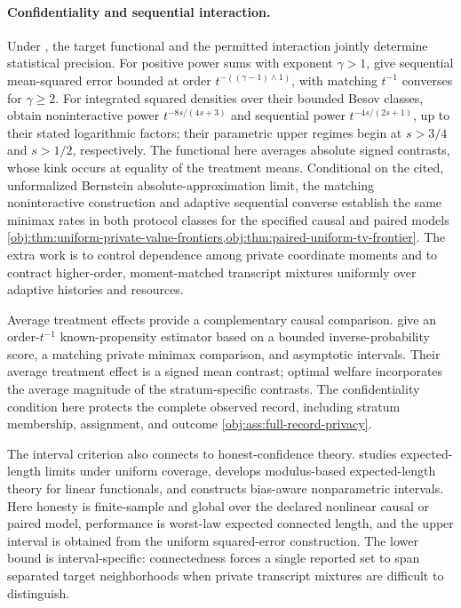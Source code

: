 \documentclass[11pt]{article}
\begin{document}
\paragraph{Confidentiality and sequential interaction.}
Under , the target functional and the permitted interaction jointly determine statistical precision. For positive power sums with exponent \(\gamma>1\), \citet[Theorems~2.4--2.7]{ButuceaIssartel2021Functionals} give sequential mean-squared error bounded at order \(t^{-((\gamma-1)\wedge1)}\), with matching \(t^{-1}\) converses for \(\gamma\ge2\). For integrated squared densities over their bounded Besov classes, \citet[Theorems~3.2--3.3 and~4.1--4.2]{ButuceaRohdeSteinberger2023Quadratic} obtain noninteractive power \(t^{-8s/(4s+3)}\) and sequential power \(t^{-4s/(2s+1)}\), up to their stated logarithmic factors; their parametric upper regimes begin at \(s>3/4\) and \(s>1/2\), respectively. The functional here averages absolute signed contrasts, whose kink occurs at equality of the treatment means. Conditional on the cited, unformalized Bernstein absolute-approximation limit, the matching noninteractive construction and adaptive sequential converse establish the same minimax rates in both protocol classes for the specified causal and paired models \cref{obj:thm:uniform-private-value-frontiers,obj:thm:paired-uniform-tv-frontier}. The extra work is to control dependence among private coordinate moments and to contract higher-order, moment-matched transcript mixtures uniformly over adaptive histories and resources.

Average treatment effects provide a complementary causal comparison. \citet[Lemma~4 and Theorem~7]{OhnishiAwan2025Randomized} give an order-\(t^{-1}\) known-propensity estimator based on a bounded inverse-probability score, a matching private minimax comparison, and asymptotic intervals. Their average treatment effect is a signed mean contrast; optimal welfare incorporates the average magnitude of the stratum-specific contrasts. The confidentiality condition here protects the complete observed record, including stratum membership, assignment, and outcome \cref{obj:ass:full-record-privacy}.

The interval criterion also connects to honest-confidence theory. \citet{Low1997} studies expected-length limits under uniform coverage, \citet{CaiLow2004AdaptationCI} develops modulus-based expected-length theory for linear functionals, and \citet{ArmstrongKolesar2020HonestCI} constructs bias-aware nonparametric intervals. Here honesty is finite-sample and global over the declared nonlinear causal or paired model, performance is worst-law expected connected length, and the upper interval is obtained from the uniform squared-error construction. The lower bound is interval-specific: connectedness forces a single reported set to span separated target neighborhoods when private transcript mixtures are difficult to distinguish.
\end{document}
